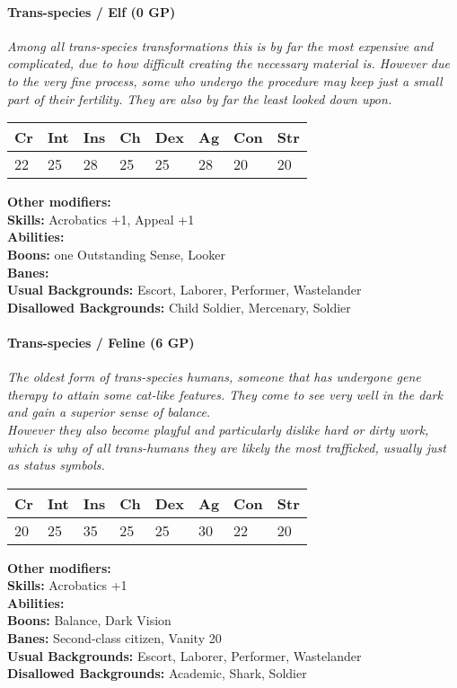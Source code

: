 \hrulefill
\paragraph*{Trans-species / Elf (0 GP)}
\textit{Among all trans-species transformations this is by far the most expensive and complicated, due to how difficult creating the necessary material is. However due to the very fine process, some who undergo the procedure may keep just a small part of their fertility. They are also by far the least looked down upon.}\par
\begin{tabular}{|l|l|l|l|l|l|l|l|}
	\hline
	Cr & Int & Ins & Ch & Dex & Ag & Con & Str \\ \hline
	22 & 25 & 28 & 25 & 25 & 28 & 20 & 20 \\ \hline
\end{tabular}\par
\noindent\textbf{Other modifiers:} \\
\textbf{Skills:} Acrobatics +1, Appeal +1\\
\textbf{Abilities:} \\
\textbf{Boons:} one Outstanding Sense, Looker\\
\textbf{Banes:} \\
\textbf{Usual Backgrounds:} Escort, Laborer, Performer, Wastelander\\
\textbf{Disallowed Backgrounds:} Child Soldier, Mercenary, Soldier

\hrulefill
\paragraph*{Trans-species / Feline (6 GP)}
\textit{The oldest form of trans-species humans, someone that has undergone gene therapy to attain some cat-like features. They come to see very well in the dark and gain a superior sense of balance.\\
	However they also become playful and particularly dislike hard or dirty work, which is why of all trans-humans they are likely the most trafficked, usually just as status symbols.}\par
\begin{tabular}{|l|l|l|l|l|l|l|l|}
	\hline
	Cr & Int & Ins & Ch & Dex & Ag & Con & Str \\ \hline
	20 & 25 & 35 & 25 & 25 & 30 & 22 & 20 \\ \hline
\end{tabular}\par
\noindent\textbf{Other modifiers:} \\
\textbf{Skills:} Acrobatics +1\\
\textbf{Abilities:} \\
\textbf{Boons:} Balance, Dark Vision\\
\textbf{Banes:} Second-class citizen, Vanity 20\\
\textbf{Usual Backgrounds:} Escort, Laborer, Performer, Wastelander\\
\textbf{Disallowed Backgrounds:} Academic, Shark, Soldier


